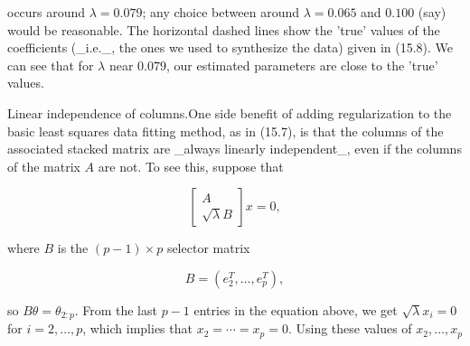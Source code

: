occurs around \(\lambda=0.079\); any choice between around \(\lambda=0.065\) and \(0.100\) (say) would be reasonable. The horizontal dashed lines show the 'true' values of the coefficients (_i.e._, the ones we used to synthesize the data) given in (15.8). We can see that for \(\lambda\) near \(0.079\), our estimated parameters are close to the 'true' values.

Linear independence of columns.One side benefit of adding regularization to the basic least squares data fitting method, as in (15.7), is that the columns of the associated stacked matrix are _always linearly independent_, even if the columns of the matrix \(A\) are not. To see this, suppose that

\[\left[\begin{array}{c}A\\ \sqrt{\lambda}B\end{array}\right]x=0,\]

where \(B\) is the \((p-1)\times p\) selector matrix

\[B=(e_{2}^{T},\ldots,e_{p}^{T}),\]

so \(B\theta=\theta_{2:p}\). From the last \(p-1\) entries in the equation above, we get \(\sqrt{\lambda}x_{i}=0\) for \(i=2,\ldots,p\), which implies that \(x_{2}=\cdots=x_{p}=0\). Using these values of \(x_{2},\ldots,x_{p}\) 